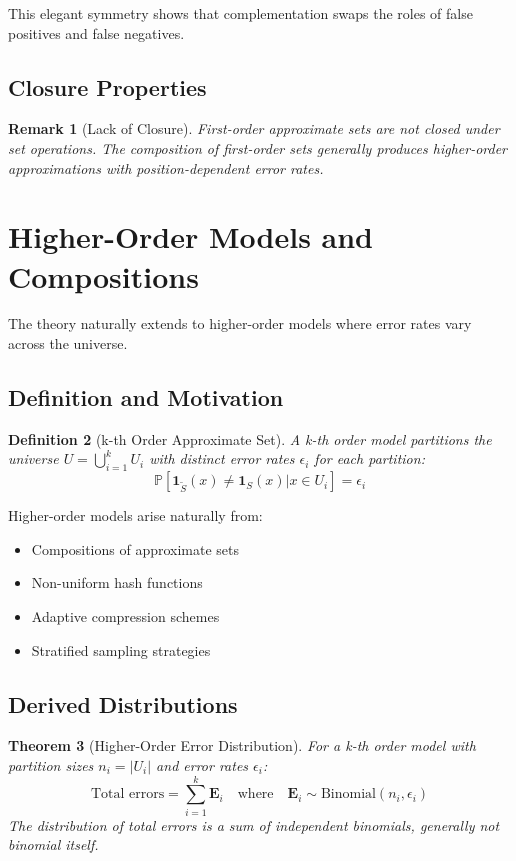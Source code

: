 \documentclass[11pt]{article}
\newtheorem{theorem}{Theorem}[section]
\newtheorem{definition}[theorem]{Definition}
\newtheorem{remark}[theorem]{Remark}
\newcommand{\observed}[1]{\tilde{#1}}  %
\newcommand{\prob}[1]{\mathbb{P}\left[#1\right]}
\newcommand{\indicator}[1]{\mathbf{1}_{#1}}
\newcommand{\card}[1]{|#1|}
\newcommand{\RV}[1]{\mathbf{#1}}
\begin{document}
This elegant symmetry shows that complementation swaps the roles of false positives and false negatives.

\subsection{Closure Properties}

\begin{remark}[Lack of Closure]
First-order approximate sets are not closed under set operations. The composition of first-order sets generally produces higher-order approximations with position-dependent error rates.
\end{remark}

\section{Higher-Order Models and Compositions}
\label{sec:higher-order}

The theory naturally extends to higher-order models where error rates vary across the universe.

\subsection{Definition and Motivation}

\begin{definition}[k-th Order Approximate Set]
A k-th order model partitions the universe $U = \bigcup_{i=1}^k U_i$ with distinct error rates $\epsilon_i$ for each partition:
$$\prob{\indicator{\observed{S}}(x) \neq \indicator{S}(x) | x \in U_i} = \epsilon_i$$
\end{definition}

Higher-order models arise naturally from:
\begin{itemize}
\item Compositions of approximate sets
\item Non-uniform hash functions
\item Adaptive compression schemes
\item Stratified sampling strategies
\end{itemize}

\subsection{Derived Distributions}

\begin{theorem}[Higher-Order Error Distribution]
For a k-th order model with partition sizes $n_i = \card{U_i}$ and error rates $\epsilon_i$:
$$\text{Total errors} = \sum_{i=1}^k \RV{E}_i \quad \text{where} \quad \RV{E}_i \sim \text{Binomial}(n_i, \epsilon_i)$$
The distribution of total errors is a sum of independent binomials, generally not binomial itself.
\end{theorem}
\end{document}
